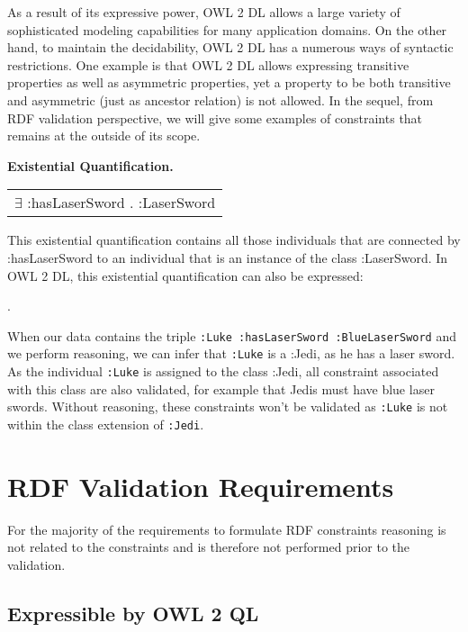 \documentclass{llncs}
\newcommand{\ms}[1]{\texttt{#1}}
\newenvironment{DL}{
  \scriptsize
  \sffamily
  \vspace{0.3cm}
  \begin{tabular}{l}

}{
  \end{tabular}
  \linebreak
}
\begin{document}
As a result of its expressive power, OWL 2 DL allows a large variety of sophisticated modeling capabilities for many application domains.  On the other hand, to maintain the decidability, OWL 2 DL has a numerous ways of syntactic restrictions. One example is that OWL 2 DL allows  expressing transitive properties as well as asymmetric properties, yet a property to be both transitive and asymmetric (just as ancestor relation) is not allowed. In the sequel, from RDF validation perspective, we will give some examples of constraints that remains at the outside of its scope. 



\textbf{Existential Quantification.}

\begin{DL}
$\exists$ :hasLaserSword . :LaserSword
\end{DL}

This existential quantification contains all those individuals that are connected by :hasLaserSword to an individual that is an instance of the class :LaserSword.
In OWL 2 DL, this existential quantification can also be expressed:

\begin{ex}
 .
\end{ex}

When our data contains the triple \ms{:Luke :hasLaserSword :BlueLaserSword} and we perform reasoning, we can infer that \ms{:Luke} is a :Jedi, as he has a laser sword.
As the individual \ms{:Luke} is assigned to the class :Jedi, all constraint associated with this class are also validated, for example that Jedis must have blue laser swords.
Without reasoning, these constraints won't be validated as \ms{:Luke} is not within the class extension of \ms{:Jedi}.

\section{RDF Validation Requirements}

For the majority of the requirements to formulate RDF constraints reasoning is not related to the constraints and is therefore not performed prior to the validation.

\subsection{Expressible by OWL 2 QL}
\end{document}
